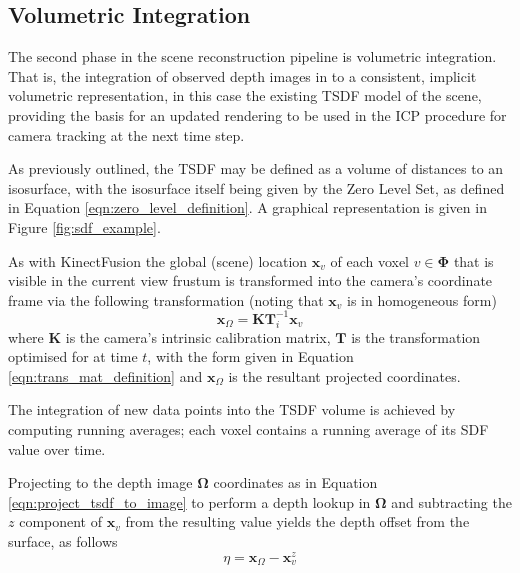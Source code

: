 \subsection{Volumetric Integration}
\label{subsec:moseg_static_integration}
The second phase in the scene reconstruction pipeline is volumetric integration.
That is, the integration of observed depth images in to a consistent, implicit
volumetric representation, in this case the existing TSDF model of the scene,
providing the basis for an updated rendering to be used in the ICP procedure
for camera tracking at the next time step.

As previously outlined, the TSDF may be defined as a volume of distances to an
isosurface, with the isosurface itself being given by the Zero Level Set, as
defined in Equation \ref{eqn:zero_level_definition}. A graphical representation
is given in Figure \ref{fig:sdf_example}.

As with KinectFusion \cite{Newcombe2011} the global (scene) location
$\mathbf{x}_{v}$ of each voxel $v \in \mathbf{\Phi}$ that is visible in the
current view frustum is transformed into the camera's coordinate frame via the
following transformation (noting that $\mathbf{x}_{v}$ is in homogeneous form)
\begin{equation}
\label{eqn:project_tsdf_to_image}
\mathbf{x}_{\Omega} = \mathbf{K}\mathbf{T}_i^{-1}\mathbf{x}_{v}
\end{equation}
where $\mathbf{K}$ is the camera's intrinsic calibration matrix, $\mathbf{T}$ is
the transformation optimised for at time $t$, with the form given in Equation
\ref{eqn:trans_mat_definition} and $\mathbf{x}_{\Omega}$ is the resultant
projected coordinates.

The integration of new data points into the TSDF volume is achieved by computing 
running averages; each voxel contains a running average of its SDF value over
time.

Projecting to the depth image $\mathbf{\Omega}$ coordinates as in Equation
\ref{eqn:project_tsdf_to_image} to perform a depth lookup in $\mathbf{\Omega}$
and subtracting the $z$ component of $\mathbf{x}_{v}$ from the resulting value
yields the depth offset from the surface, as follows
\begin{equation}
  \label{eqn:integration_offset}
  \eta = \mathbf{x}_{\Omega} - \mathbf{x}_{v}^{z}
\end{equation}

